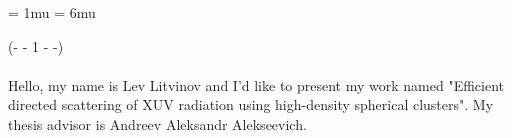 \documentclass[11pt]{article}
\begin{document}



	\pagestyle{fancy}
	\fancyhf{}
	\fancyhead[L]{\textit{\nouppercase{\leftmark}}}
	\fancyfoot[C]{\thepage}

	\thinmuskip = 1mu
	\thickmuskip = 6mu

	\renewcommand{\equationautorefname}{}



	\noindent(- - 1 - -)\\~\\
	Hello, my name is Lev Litvinov and I'd like to present my work named "Efficient directed scattering of XUV radiation using high-density spherical clusters". My thesis advisor is Andreev Aleksandr Alekseevich.

	
	
	
	

\end{document}

